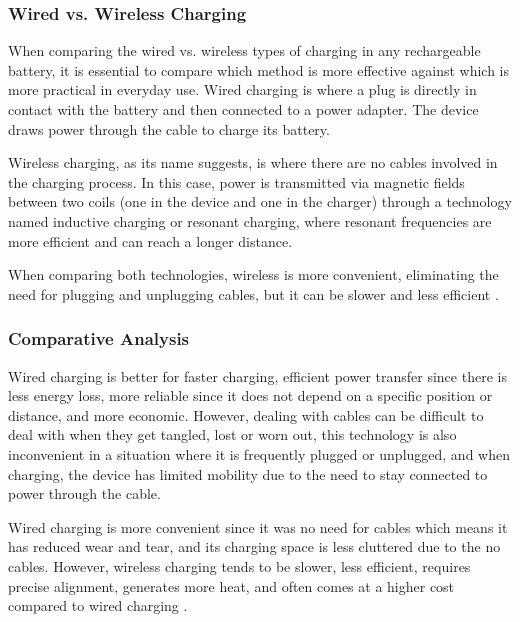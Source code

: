 \subsubsection{Wired vs. Wireless Charging}
When comparing the wired vs. wireless types of charging in any rechargeable battery, it is essential to compare which method is more effective against which is more practical in everyday use. Wired charging is where a plug is directly in contact with the battery and then connected to a power adapter. The device draws power through the cable to charge its battery. 

Wireless charging, as its name suggests, is where there are no cables involved in the charging process. In this case, power is transmitted via magnetic fields between two coils (one in the device and one in the charger) through a technology named inductive charging or resonant charging, where resonant frequencies are more efficient and can reach a longer distance. 

When comparing both technologies, wireless is more convenient, eliminating the need for plugging and unplugging cables, but it can be slower and less efficient \cite{wiredvwirelessMohammed}.


\subsubsection{Comparative Analysis}
Wired charging is better for faster charging, efficient power transfer since there is less energy loss, more reliable since it does not depend on a specific position or distance, and more economic. However, dealing with cables can be difficult to deal with when they get tangled, lost or worn out, this technology is also inconvenient in a situation where it is frequently plugged or unplugged, and when charging, the device has limited mobility due to the need to stay connected to power through the cable. 

Wired charging is more convenient since it was no need for cables which means it has reduced wear and tear, and its charging space is less cluttered due to the no cables. However, wireless charging tends to be slower, less efficient, requires precise alignment, generates more heat, and often comes at a higher cost compared to wired charging \cite{wirelessLu}.

